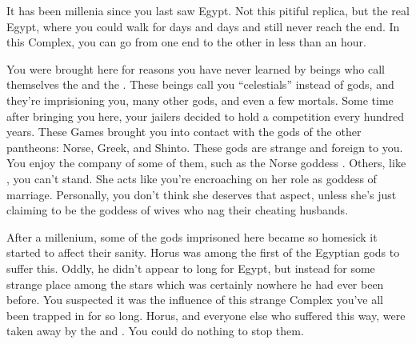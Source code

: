 \documentclass[char]{guardians}
\begin{document}
\name{\cIsis{}}




It has been millenia since you last saw Egypt. Not this pitiful replica, but the real Egypt, where you could walk for days and days and still never reach the end. In this Complex, you can go from one end to the other in less than an hour.

You were brought here for reasons you have never learned by beings who call themselves the \cCaretaker{} and the \cWarden{}. These beings call you ``celestials'' instead of gods, and they're imprisioning you, many other gods, and even a few mortals. Some time after bringing you here, your jailers decided to hold a competition every hundred years. These Games brought you into contact with the gods of the other pantheons: Norse, Greek, and Shinto. These gods are strange and foreign to you. You enjoy the company of some of them, such as the Norse goddess \cHel{}. Others, like \cHera{}, you can't stand. She acts like you're encroaching on her role as goddess of marriage. Personally, you don't think she deserves that aspect, unless she's just claiming to be the goddess of wives who nag their cheating husbands.


After a millenium, some of the gods imprisoned here became so homesick it started to affect their sanity. Horus was among the first of the Egyptian gods to suffer this. Oddly, he didn't appear to long for Egypt, but instead for some strange place among the stars which was certainly nowhere he had ever been before. You suspected it was the influence of this strange Complex you've all been trapped in for so long. Horus, and everyone else who suffered this way, were taken away by the \cCaretaker{} and \cWarden{}. You could do nothing to stop them.
\end{document}
